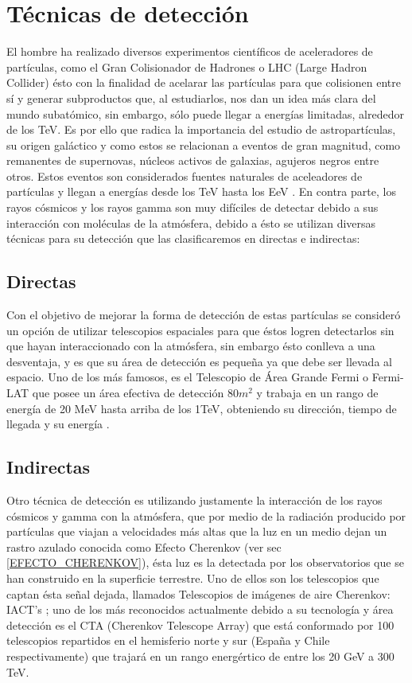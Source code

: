 \chapter{Técnicas de detección}\label{TECNICAS_DE_DETECCION}
El hombre ha realizado diversos experimentos científicos de aceleradores de partículas, como el Gran Colisionador de Hadrones o LHC (Large Hadron Collider) ésto con la finalidad de acelarar las partículas para que colisionen entre sí y generar subproductos que, al estudiarlos, nos dan un idea más clara del mundo subatómico, sin embargo, sólo puede llegar a energías limitadas, alrededor de los TeV. Es por ello que radica la importancia del estudio de astropartículas, su origen galáctico y como estos se relacionan a eventos de gran magnitud, como remanentes de supernovas, núcleos activos de galaxias, agujeros negros entre otros. Estos eventos son considerados fuentes naturales de aceleadores de partículas y llegan a energías desde los TeV hasta los EeV \cite{Gonzales}. En contra parte, los rayos cósmicos y los rayos gamma son muy difíciles de detectar debido a sus interacción con moléculas de la atmósfera, debido a ésto se utilizan diversas técnicas para su detección que las clasificaremos en directas e indirectas:
\section{Directas}
	Con el objetivo de mejorar la forma de detección de estas partículas se consideró un opción de utilizar telescopios espaciales para que éstos logren detectarlos sin que hayan interaccionado con la atmósfera, sin embargo ésto conlleva a una desventaja, y es que su área de detección es pequeña ya que debe ser llevada al espacio. Uno de los más famosos, es el Telescopio de Área Grande Fermi o Fermi-LAT que posee un área efectiva de detección $80 m^2$ y trabaja en un rango de energía de 20 MeV hasta arriba de los 1TeV, obteniendo su dirección, tiempo de llegada y su energía \cite{Abdollahi_2020}.
\section{Indirectas}
	Otro técnica de detección es utilizando justamente la interacción de los rayos cósmicos y gamma con la atmósfera, que por medio de la radiación producido por partículas que viajan a velocidades más altas que la luz en un medio dejan un rastro azulado conocida como Efecto Cherenkov (ver sec \ref{EFECTO_CHERENKOV}), ésta luz es la detectada por los observatorios que se han construido en la superficie terrestre. Uno de ellos son los telescopios que captan ésta señal dejada, llamados Telescopios de imágenes de aire Cherenkov: IACT's \cite{Wild}; uno de los más reconocidos actualmente debido a su tecnología y área detección es el CTA (Cherenkov Telescope Array) que está conformado por 100 telescopios repartidos en el hemisferio norte y sur (España y Chile respectivamente) que trajará en un rango energértico de entre los 20 GeV a 300 TeV.
	
